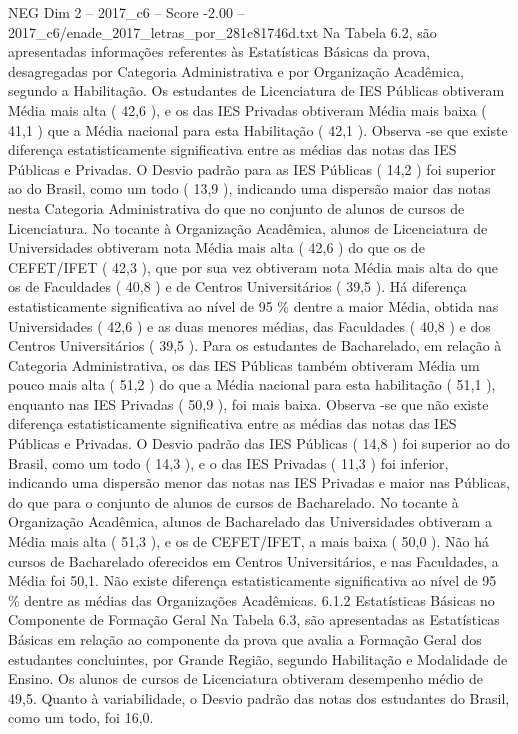 \begin{textsample}{NEG Dim 2 – 2017\_c6 – Score -2.00 – 2017\_c6/enade\_2017\_letras\_por\_281c81746d.txt}
Na Tabela 6.2, são apresentadas informações referentes às Estatísticas Básicas da prova, desagregadas por Categoria Administrativa e por Organização Acadêmica, segundo a Habilitação.
Os estudantes de Licenciatura de IES Públicas obtiveram Média mais alta ( 42,6 ), e os das IES Privadas obtiveram Média mais baixa ( 41,1 ) que a Média nacional para esta Habilitação ( 42,1 ).
Observa -se que existe diferença estatisticamente significativa entre as médias das notas das IES Públicas e Privadas.
O Desvio padrão para as IES Públicas ( 14,2 ) foi superior ao do Brasil, como um todo ( 13,9 ), indicando uma dispersão maior das notas nesta Categoria Administrativa do que no conjunto de alunos de cursos de Licenciatura.
No tocante à Organização Acadêmica, alunos de Licenciatura de Universidades obtiveram nota Média mais alta ( 42,6 ) do que os de CEFET/IFET ( 42,3 ), que por sua vez obtiveram nota Média mais alta do que os de Faculdades ( 40,8 ) e de Centros Universitários ( 39,5 ).
Há diferença estatisticamente significativa ao nível de 95 \% dentre a maior Média, obtida nas Universidades ( 42,6 ) e as duas menores médias, das Faculdades ( 40,8 ) e dos Centros Universitários ( 39,5 ).
Para os estudantes de Bacharelado, em relação à Categoria Administrativa, os das IES Públicas também obtiveram Média um pouco mais alta ( 51,2 ) do que a Média nacional para esta habilitação ( 51,1 ), enquanto nas IES Privadas ( 50,9 ), foi mais baixa.
Observa -se que não existe diferença estatisticamente significativa entre as médias das notas das IES Públicas e Privadas.
O Desvio padrão das IES Públicas ( 14,8 ) foi superior ao do Brasil, como um todo ( 14,3 ), e o das IES Privadas ( 11,3 ) foi inferior, indicando uma dispersão menor das notas nas IES Privadas e maior nas Públicas, do que para o conjunto de alunos de cursos de Bacharelado.
No tocante à Organização Acadêmica, alunos de Bacharelado das Universidades obtiveram a Média mais alta ( 51,3 ), e os de CEFET/IFET, a mais baixa ( 50,0 ).
Não há cursos de Bacharelado oferecidos em Centros Universitários, e nas Faculdades, a Média foi 50,1.
Não existe diferença estatisticamente significativa ao nível de 95 \% dentre as médias das Organizações Acadêmicas. 6.1.2 Estatísticas Básicas no Componente de Formação Geral Na Tabela 6.3, são apresentadas as Estatísticas Básicas em relação ao componente da prova que avalia a Formação Geral dos estudantes concluintes, por Grande Região, segundo Habilitação e Modalidade de Ensino.
Os alunos de cursos de Licenciatura obtiveram desempenho médio de 49,5.
Quanto à variabilidade, o Desvio padrão das notas dos estudantes do Brasil, como um todo, foi 16,0.

\end{textsample}
